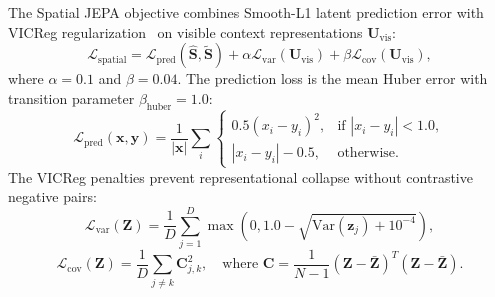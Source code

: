 \documentclass{svproc}
\begin{document}
The Spatial JEPA objective combines Smooth-L1 latent prediction error with VICReg regularization~\cite{bardes2022vicreg} on visible context representations $\mathbf{U}_{\text{vis}}$:
\begin{equation}
\mathcal{L}_{\text{spatial}} = \mathcal{L}_{\text{pred}}\left(\hat{\mathbf{S}}, \tilde{\mathbf{S}}\right) + \alpha \mathcal{L}_{\text{var}}\left(\mathbf{U}_{\text{vis}}\right) + \beta \mathcal{L}_{\text{cov}}\left(\mathbf{U}_{\text{vis}}\right),
\end{equation}
where $\alpha = 0.1$ and $\beta = 0.04$. The prediction loss is the mean Huber error with transition parameter $\beta_{\text{huber}} = 1.0$:
\begin{equation}
\mathcal{L}_{\text{pred}}(\mathbf{x}, \mathbf{y}) = \frac{1}{|\mathbf{x}|} \sum_i \begin{cases} 
0.5 (x_i - y_i)^2, & \text{if } |x_i - y_i| < 1.0, \\ 
|x_i - y_i| - 0.5, & \text{otherwise}. 
\end{cases}
\end{equation}
The VICReg penalties prevent representational collapse without contrastive negative pairs:
\begin{equation}
\mathcal{L}_{\text{var}}(\mathbf{Z}) = \frac{1}{D} \sum_{j=1}^D \max\left(0, 1.0 - \sqrt{\mathrm{Var}(\mathbf{z}_j) + 10^{-4}}\right),
\end{equation}
\begin{equation}
\mathcal{L}_{\text{cov}}(\mathbf{Z}) = \frac{1}{D} \sum_{j \neq k} \mathbf{C}_{j,k}^2, \quad \text{where } \mathbf{C} = \frac{1}{N - 1} (\mathbf{Z} - \bar{\mathbf{Z}})^T (\mathbf{Z} - \bar{\mathbf{Z}}).
\end{equation}
\end{document}
